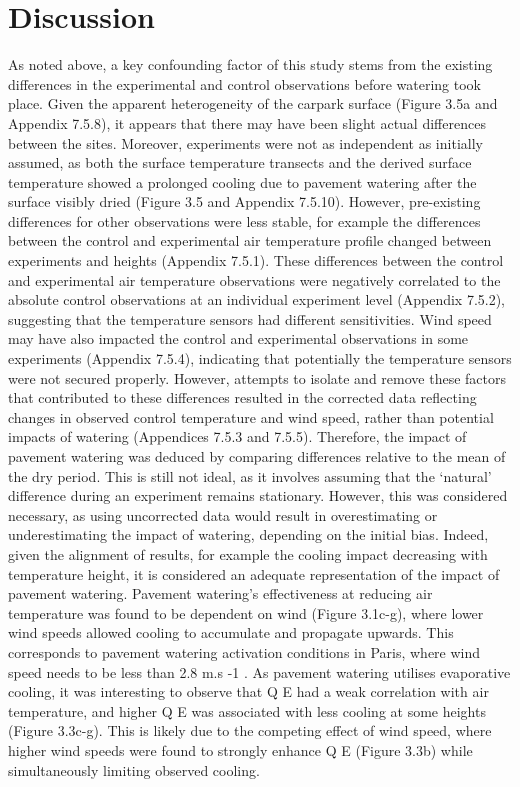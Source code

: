 \documentclass[final,3p,times,authoryear]{elsarticle}
\begin{document}
\section{Discussion}\label{sec:discussion}

As noted above, a key confounding factor of this study stems from the existing
differences in the experimental and control observations before watering took place.
Given the apparent heterogeneity of the carpark surface (Figure 3.5a and Appendix
7.5.8), it appears that there may have been slight actual differences between the sites.
Moreover, experiments were not as independent as initially assumed, as both the surface
temperature transects and the derived surface temperature showed a prolonged cooling
due to pavement watering after the surface visibly dried (Figure 3.5 and Appendix
7.5.10). However, pre-existing differences for other observations were less stable, for
example the differences between the control and experimental air temperature profile
changed between experiments and heights (Appendix 7.5.1).
These differences between the control and experimental air temperature observations
were negatively correlated to the absolute control observations at an individual
experiment level (Appendix 7.5.2), suggesting that the temperature sensors had different
sensitivities. Wind speed may have also impacted the control and experimental
observations in some experiments (Appendix 7.5.4), indicating that potentially the
temperature sensors were not secured properly. However, attempts to isolate and
remove these factors that contributed to these differences resulted in the corrected data reflecting changes in observed control temperature and wind speed, rather than potential
impacts of watering (Appendices 7.5.3 and 7.5.5).
Therefore, the impact of pavement watering was deduced by comparing differences
relative to the mean of the dry period. This is still not ideal, as it involves assuming that
the ‘natural’ difference during an experiment remains stationary. However, this was
considered necessary, as using uncorrected data would result in overestimating or
underestimating the impact of watering, depending on the initial bias. Indeed, given the
alignment of results, for example the cooling impact decreasing with temperature
height, it is considered an adequate representation of the impact of pavement watering.
Pavement watering’s effectiveness at reducing air temperature was found to be
dependent on wind (Figure 3.1c-g), where lower wind speeds allowed cooling to
accumulate and propagate upwards. This corresponds to pavement watering activation
conditions in Paris, where wind speed needs to be less than 2.8 m.s -1 \cite{Hendel2015a}.
As pavement watering utilises evaporative cooling, it was interesting to observe that Q E
had a weak correlation with air temperature, and higher Q E was associated with less
cooling at some heights (Figure 3.3c-g). This is likely due to the competing effect of
wind speed, where higher wind speeds were found to strongly enhance Q E (Figure 3.3b)
while simultaneously limiting observed cooling.
\end{document}
